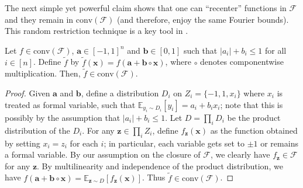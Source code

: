 The next simple yet powerful claim shows that one can ``recenter'' functions in $\mathcal{F}$ and they remain in $\mathrm{conv}(\mathcal{F})$ (and therefore, enjoy the same Fourier bounds). This random restriction technique is a key tool in \cite{CHHL}.

    \begin{lemma} \label{lem:conv}
        Let $f \in \mathrm{conv}(\mathcal{F})$, $\mathbf{a} \in [-1,1]^n$ and $\mathbf{b} \in [0,1]$ such that $ \vert a_i\vert + b_i \leq 1$ for all $i\in [n]$. 
        Define $\tilde{f} $ by $\tilde{f}(\mathbf{x}) = f(\mathbf{a} + \mathbf{b} \circ \mathbf{x})$, where $\circ$ denotes componentwise multiplication. Then, $\tilde{f}  \in \mathrm{conv}(\mathcal{F})$. 
    \end{lemma}
    \begin{proof}
        Given $\mathbf{a}$ and $\mathbf{b}$, define a distribution $D_i$ on $Z_i= \{ -1,1 , x_i\} $ where $x_i$ is treated as formal variable, such that $\mathbb{E}_{y_i \sim D_i }[ y_i] = a_i + b_i x_i  $; note that this is possibly by the assumption that $\vert a_i\vert + b_i \leq 1$. 
        Let $D = \prod_i D_i  $ be the product distribution of the $D_i$. For any $\mathbf{z} \in \prod_i Z_i $, define $f_{\mathbf{z}}(\mathbf{x})$ as the function obtained by setting $x_i=z_i$ for each $i$; in particular, each variable gets set to $\pm 1$ or remains a formal variable.  By our assumption on the closure of $\mathcal{F}$, we clearly have $f_{\mathbf{z}}\in \mathcal{F}$ for any $\mathbf{z}$. By multilinearity and independence of the product distribution, we have $f(\mathbf{a} + \mathbf{b} \circ \mathbf{x}) = \mathbb{E}_{\mathbf{z} \sim D}[ f_{\mathbf{z}}(\mathbf{x})]  $. Thus $\tilde{f} \in \mathrm{conv}(\mathcal{F})$. 
    \end{proof}

